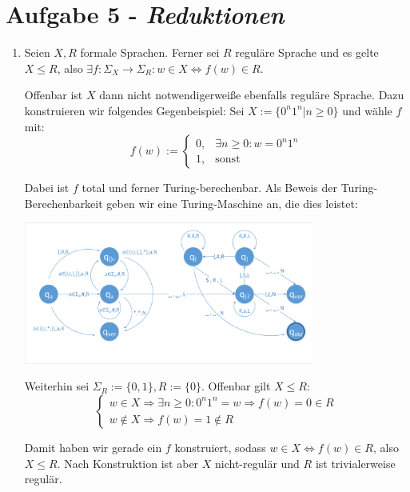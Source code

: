 \documentclass{article}
\begin{document}
\section*{Aufgabe 5 - \textit{Reduktionen}}

\begin{enumerate}
	\item Seien $X, R$ formale Sprachen. Ferner sei $R$ reguläre Sprache und es gelte $X \le R$, also $\exists f: \Sigma_X \to \Sigma_R : w\in X \Leftrightarrow f(w) \in R$.
	
	Offenbar ist $X$ dann nicht notwendigerweiße ebenfalls reguläre Sprache. Dazu konstruieren wir folgendes Gegenbeispiel: Sei $X := \{0^n1^n | n \ge 0 \}$ und wähle $f$ mit:
	\begin{equation}
		f(w) := \begin{cases}
		0, &\exists n \ge 0 : w = 0^n1^n \\
		1, &\text{sonst}
		\end{cases}
	\end{equation}
	
	Dabei ist $f$ total und ferner Turing-berechenbar. Als Beweis der Turing-Berechenbarkeit geben wir eine Turing-Maschine an, die dies leistet:
	
	\begin{minipage}{\textwidth}
		\centering\includegraphics[width=0.75\textwidth,page=2,trim={2 2 2 4},clip]{diagramme.pdf}
	\end{minipage}
	
	Weiterhin sei $\Sigma_R := \{0,1\}, R:= \{0\}$. Offenbar gilt $X \le R$:
	\begin{equation}
		\begin{cases}
		w \in X \Rightarrow \exists n \ge 0 : 0^n 1^n = w \Rightarrow f(w) = 0 \in R\\
		w \not\in  X \Rightarrow f(w)=1 \not\in R
		\end{cases}
	\end{equation}
	
	Damit haben wir gerade ein $f$ konstruiert, sodass $w \in X \Leftrightarrow f(w) \in R$, also $X \le R$. Nach Konstruktion ist aber $X$ nicht-regulär und $R$ ist trivialerweise regulär.
	

\end{enumerate}
\end{document}
